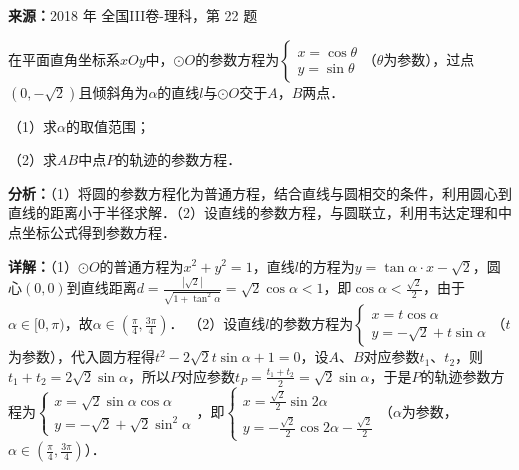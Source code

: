 \begin{question}[points=10]
\textbf{来源：}2018 年 全国III卷-理科，第 22 题\par
在平面直角坐标系$xOy$中，$\odot O$的参数方程为$\begin{cases}x=\cos\theta\\ y=\sin\theta\end{cases}$（$\theta$为参数），过点$(0,-\sqrt{2})$且倾斜角为$\alpha$的直线$l$与$\odot O$交于$A$，$B$两点．

（1）求$\alpha$的取值范围；

（2）求$AB$中点$P$的轨迹的参数方程．
\begin{solution}

\textbf{分析：}（1）将圆的参数方程化为普通方程，结合直线与圆相交的条件，利用圆心到直线的距离小于半径求解．（2）设直线的参数方程，与圆联立，利用韦达定理和中点坐标公式得到参数方程．

\textbf{详解：}（1）$\odot O$的普通方程为$x^2+y^2=1$，直线$l$的方程为$y=\tan\alpha\cdot x-\sqrt{2}$，圆心$(0,0)$到直线距离$d=\frac{|\sqrt{2}|}{\sqrt{1+\tan^2\alpha}}=\sqrt{2}\cos\alpha<1$，即$\cos\alpha<\frac{\sqrt{2}}{2}$，由于$\alpha\in[0,\pi)$，故$\alpha\in(\frac{\pi}{4},\frac{3\pi}{4})$．
（2）设直线$l$的参数方程为$\begin{cases}x=t\cos\alpha\\ y=-\sqrt{2}+t\sin\alpha\end{cases}$（$t$为参数），代入圆方程得$t^2-2\sqrt{2}t\sin\alpha+1=0$，设$A$、$B$对应参数$t_1$、$t_2$，则$t_1+t_2=2\sqrt{2}\sin\alpha$，所以$P$对应参数$t_P=\frac{t_1+t_2}{2}=\sqrt{2}\sin\alpha$，于是$P$的轨迹参数方程为$\begin{cases}x=\sqrt{2}\sin\alpha\cos\alpha\\ y=-\sqrt{2}+\sqrt{2}\sin^2\alpha\end{cases}$，即$\begin{cases}x=\frac{\sqrt{2}}{2}\sin2\alpha\\ y=-\frac{\sqrt{2}}{2}\cos2\alpha-\frac{\sqrt{2}}{2}\end{cases}$（$\alpha$为参数，$\alpha\in(\frac{\pi}{4},\frac{3\pi}{4})$）．
\end{solution}
\end{question}

